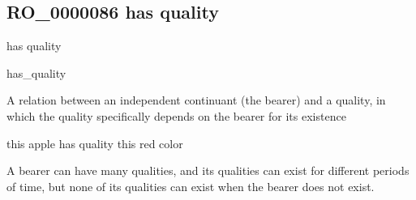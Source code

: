 \documentclass[letterpaper,10pt,english]{sphinxmanual}
\begin{document}
\subsection{RO\_0000086 \sphinxhyphen{} has quality}
\label{\detokenize{doc-RO_0000086:ro-0000086-has-quality}}\label{\detokenize{doc-RO_0000086:index-0}}\label{\detokenize{doc-RO_0000086::doc}}
\begin{sphinxShadowBox}

\sphinxAtStartPar
has quality
\end{sphinxShadowBox}

\begin{sphinxShadowBox}

\sphinxAtStartPar
has\_quality
\end{sphinxShadowBox}

\begin{sphinxShadowBox}

\sphinxAtStartPar
{\hyperref[\detokenize{doc-RO_0000053::doc}]{}}
\end{sphinxShadowBox}

\begin{sphinxShadowBox}

\sphinxAtStartPar
A relation between an independent continuant (the bearer) and a quality, in which the quality specifically depends on the bearer for its existence
\end{sphinxShadowBox}

\begin{sphinxShadowBox}

\sphinxAtStartPar
this apple has quality this red color
\end{sphinxShadowBox}

\begin{sphinxShadowBox}

\sphinxAtStartPar
A bearer can have many qualities, and its qualities can exist for different periods of time, but none of its qualities can exist when the bearer does not exist.
\end{sphinxShadowBox}

\begin{sphinxShadowBox}

\sphinxAtStartPar
{}
\end{sphinxShadowBox}
\begin{quote}

\ignorespaces \end{quote}
\end{document}
